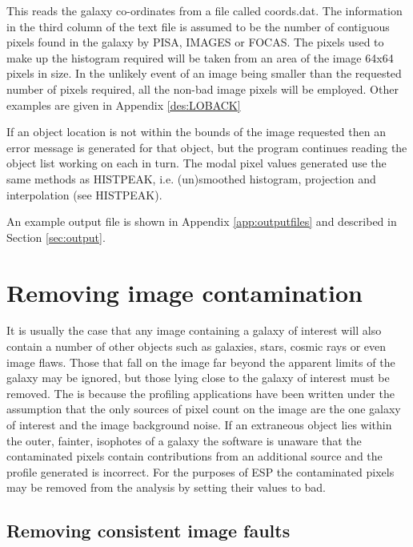 \documentclass[twoside,11pt]{article}
\newcommand{\xref}[3]{#1}
\begin{document}
This reads the galaxy co-ordinates from a file called coords.dat. The 
information in the third column of the text file is assumed to be the 
number of contiguous pixels found in the galaxy by \xref{PISA}{sun109}{}, 
IMAGES or FOCAS. The 
pixels used to make up the histogram required will be taken from an 
area of the image 64x64 pixels in size. In the unlikely event
of an image being smaller than the requested number of pixels required,
all the non-bad image pixels will be employed. Other examples are given in
Appendix \ref{des:LOBACK}

If an object location 
is not within the bounds of the image requested then an
error message is generated for that object, but the program continues
reading the object list working on each in turn. The modal pixel values
generated use the same methods as HISTPEAK, i.e. (un)smoothed histogram,
projection and interpolation (see HISTPEAK).

An example output file is shown in 
Appendix \ref{app:outputfiles}
and described in 
Section \ref{sec:output}.


\section{Removing image contamination}
\label{sec:removi}

It is usually the case that any image containing a galaxy of interest will
also contain a number of other objects such as galaxies, stars, cosmic rays 
or even image flaws.
Those that fall on the image far beyond the apparent limits of the 
galaxy may be ignored, but those lying close 
to the galaxy of interest must be
removed. The is because the profiling applications have been
written under the assumption that the only sources of pixel count
on the image are the one galaxy of interest and the image background noise.
If an extraneous object lies within the outer, fainter, isophotes of a galaxy
the software is unaware that the contaminated pixels contain 
contributions from an additional source and the profile generated is incorrect.
For the purposes of ESP the contaminated pixels may be removed from the
analysis by setting their values to bad.  

\subsection{Removing consistent image faults}
\end{document}
